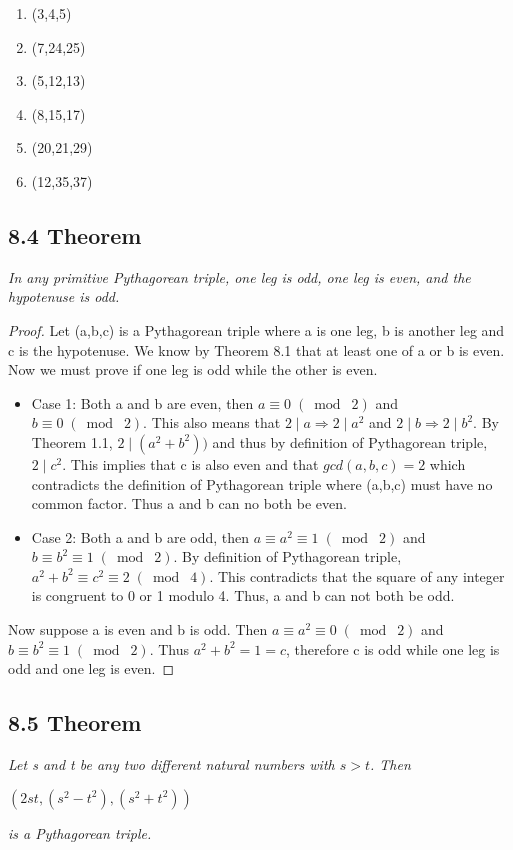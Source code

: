\documentclass{article}
\begin{document}
\begin{enumerate}
    \item (3,4,5)
    \item (7,24,25)
    \item (5,12,13)
    \item (8,15,17)
    \item (20,21,29)
    \item (12,35,37)
\end{enumerate}

\subsection*{8.4 Theorem} 
\quad \textit{In any primitive Pythagorean triple, one leg is odd, one leg is even, and the hypotenuse is odd.}

\begin{proof}
Let (a,b,c) is a Pythagorean triple where a is one leg, b is another leg and c is the hypotenuse. We know by Theorem 8.1 that at least one of a or b is even. Now we must prove if one leg is odd while the other is even.
\begin{itemize}
    \item Case 1: Both a and b are even, then $a \equiv 0 \;(\bmod\; 2)$ and $b \equiv 0 \;(\bmod\; 2)$. This also means that $2 \mid a \Longrightarrow 2 \mid a^2$ and $2 \mid b \Longrightarrow 2 \mid b^2$. By Theorem 1.1, $2 \mid (a^2 + b^2))$ and thus by definition of Pythagorean triple,$2 \mid c^2$. This implies that c is also even and that $gcd(a,b,c) = 2$ which contradicts the definition of Pythagorean triple where (a,b,c) must have no common factor. Thus a and b can no both be even.
    \item Case 2: Both a and b are odd, then $a \equiv a^2 \equiv 1 \;(\bmod\; 2)$ and $b \equiv b^2 \equiv 1 \;(\bmod\; 2)$. By definition of Pythagorean triple, $a^2 + b^2 \equiv c^2 \equiv 2 \;(\bmod\; 4)$. This contradicts that the square of any integer is congruent to 0 or 1 modulo 4. Thus, a and b can not both be odd.
\end{itemize}
Now suppose a is even and b is odd. Then $a \equiv a^2 \equiv 0 \;(\bmod\; 2)$ and $b \equiv b^2 \equiv 1 \;(\bmod\; 2)$. Thus $a^2 + b^2 = 1 = c$, therefore c is odd while one leg is odd and one leg is even.
\end{proof}

\subsection*{8.5 Theorem} 
\quad \textit{Let s and t be any two different natural numbers with $s > t$. Then}
\begin{center}
    $(2st,(s^2-t^2),(s^2+t^2))$
\end{center}
\textit{is a Pythagorean triple.}
\end{document}
